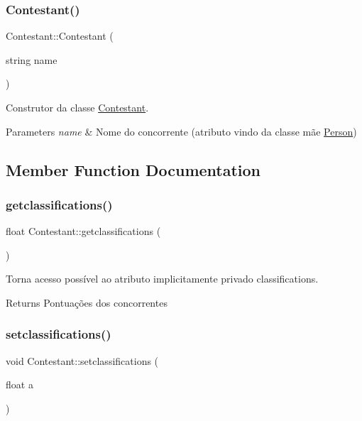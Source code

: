 \subsubsection{\texorpdfstring{Contestant()}{Contestant()}}
{\footnotesize\ttfamily Contestant\+::\+Contestant (\begin{DoxyParamCaption}\item[{string}]{name }\end{DoxyParamCaption})}



Construtor da classe \hyperlink{class_contestant}{Contestant}. 


\begin{DoxyParams}{Parameters}
{\em name} & Nome do concorrente (atributo vindo da classe mãe \hyperlink{class_person}{Person}) \\
\hline
\end{DoxyParams}


\subsection{Member Function Documentation}
\hypertarget{class_contestant_afd136f110593d3e5dcd2bafa5454b973}{}\label{class_contestant_afd136f110593d3e5dcd2bafa5454b973} 
\subsubsection{\texorpdfstring{getclassifications()}{getclassifications()}}
{\footnotesize\ttfamily float Contestant\+::getclassifications (\begin{DoxyParamCaption}{ }\end{DoxyParamCaption})}



Torna acesso possível ao atributo implicitamente privado classifications. 

\begin{DoxyReturn}{Returns}
Pontuações dos concorrentes 
\end{DoxyReturn}
\hypertarget{class_contestant_a1e93516729ecfd8d49fc5dc6b8d2e01a}{}\label{class_contestant_a1e93516729ecfd8d49fc5dc6b8d2e01a} 
\subsubsection{\texorpdfstring{setclassifications()}{setclassifications()}}
{\footnotesize\ttfamily void Contestant\+::setclassifications (\begin{DoxyParamCaption}\item[{float}]{a }\end{DoxyParamCaption})}



